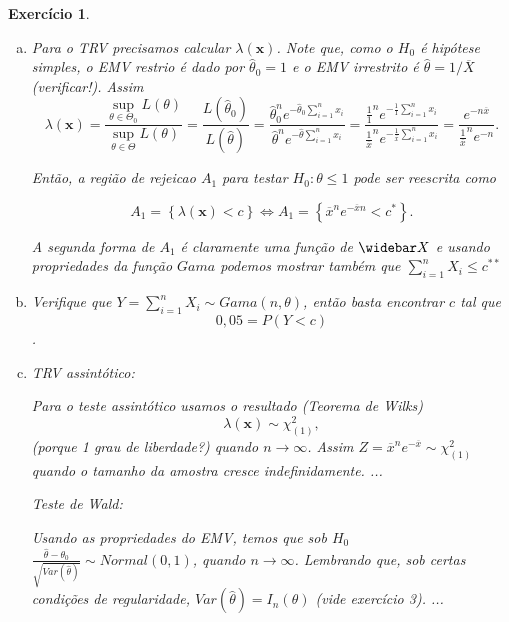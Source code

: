 \documentclass[letter,11pt]{article}
\newtheorem{exer}{Exercício}
\begin{document}
\begin{exer} \rm

\begin{enumerate}[a)]

\item %
Para o TRV precisamos calcular $\lambda(\boldsymbol{x})$. Note que, como o $H_0$ é hipótese simples, o EMV restrio é dado por $\hat \theta_0 = 1$ e o EMV irrestrito é $\hat \theta = 1 / \overline{X}$ (verificar!). Assim
$$ \lambda(\boldsymbol{x}) = \frac{\sup_{\theta \in \Theta_0} L(\theta)}{\sup_{\theta \in \Theta} L(\theta)} = \frac{L(\hat \theta_0)}{L(\hat \theta)}  = \frac{\hat \theta_0^n e^{- \hat \theta_0 \sum_{i=1}^n x_i}}{\hat \theta^n e^{- \hat \theta \sum_{i=1}^n x_i}}= \frac{\frac{1}{1}^n e^{- \frac{1}{1} \sum_{i=1}^n x_i}}{\frac{1}{\overline x}^n e^{- \frac{1}{\overline x} \sum_{i=1}^n x_i}} = \frac{e^{- n \overline{x}}}{\frac{1}{\overline x}^n e^{- n}}.$$

Então, a região de rejeicao $A_1$ para testar $H_0:\theta \leq 1$ pode ser reescrita como 

$$ A_1 = \left\{ \lambda(\boldsymbol{x}) < c \right\} \Leftrightarrow A_1 = \left\{ \overline{x}^n e^{-\overline{x} n} < c^* \right\}.$$

A segunda forma de $A_1$ é claramente uma função de $\widebar X$ e usando propriedades da função $Gama$ podemos mostrar também que $\sum_{i=1}^n X_i \leq c^{**}$ 

\item %
Verifique que $Y = \sum_{i=1}^n X_i \sim Gama(n, \theta)$, então basta encontrar $c$ tal que $$ 0,05 = P(Y < c) $$.


\item %
TRV assintótico:

Para o teste assintótico usamos o resultado (Teorema de Wilks) 
$$\lambda(\boldsymbol{x}) \sim \chi^2_{(1)},$$ 
(porque 1 grau de liberdade?) quando $n \rightarrow \infty$. Assim $ Z =  \overline{x}^n e^{-\overline{x}} \sim \chi^2_{(1)}$ quando o tamanho da amostra cresce indefinidamente. ...


Teste de Wald:

Usando as propriedades do EMV, temos que sob $H_0$ $\frac{\widehat \theta - \theta_0}{\sqrt{Var(\widehat \theta)}} \sim Normal(0, 1)$, quando $n \rightarrow \infty$. Lembrando que, sob certas condições de regularidade, $Var(\widehat \theta) = I_n(\theta)$ (vide exercício 3). ...



\end{enumerate}
\end{exer}
\end{document}
